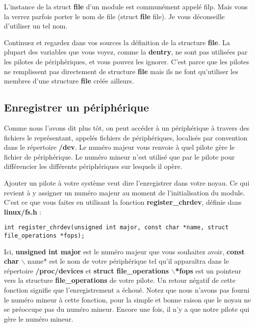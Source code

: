\documentclass[11pt]{article}
\begin{document}
L'instance de la struct \textbf{file} d'un module est communément appelé filp. Mais vous la verrez parfois porter le nom de file (struct \textbf{file} file). Je vous déconseille d'utiliser un tel nom.

Continuez et regardez dans vos sources la définition de la structure \textbf{file}. La plupart des variables que vous voyez, comme la \textbf{dentry}, ne sont pas utilisées par les pilotes de périphériques, et vous pouvez les ignorer. C'est parce que les pilotes ne remplissent pas directement de structure \textbf{file} mais ils ne font qu'utiliser les membres d'une structure \textbf{file} créée ailleurs.

\subsection*{Enregistrer un périphérique}
\label{sec-6-3}

Comme nous l'avons dit plus tôt, on peut accéder à un périphérique à travers des fichiers le représentant, appelés fichiers de périphériques, localisés par convention dans le répertoire \textbf{/dev}. Le numéro majeur vous renvoie à quel pilote gère le fichier de périphérique. Le numéro mineur n'est utilisé que par le pilote pour différencier les différents périphériques sur lesquels il opère.

Ajouter un pilote à votre système veut dire l'enregistrer dans votre noyau. Ce qui revient à y assigner un numéro majeur au moment de l'initialisation du module. C'est ce que vous faites en utilisant la fonction \textbf{register\_chrdev}, définie dans \textbf{linux/fs.h} :

\begin{verbatim}
int register_chrdev(unsigned int major, const char *name, struct file_operations *fops);
\end{verbatim}

Ici, \textbf{unsigned int major} est le numéro majeur que vous souhaitez avoir, \textbf{const char $\backslash$} name* est le nom de votre périphérique tel qu'il apparaîtra dans le répertoire \textbf{/proc/devices} et \textbf{struct file\_operations $\backslash$*fops} est un pointeur vers la structure \textbf{file\_operations} de votre pilote. Un retour négatif de cette fonction signifie que l'enregistrement a échoué. Notez que nous n'avons pas fourni le numéro mineur à cette fonction, pour la simple et bonne raison que le noyau ne se préoccupe pas du numéro mineur. Encore une fois, il n'y a que notre pilote qui gère le numéro mineur.
\end{document}
